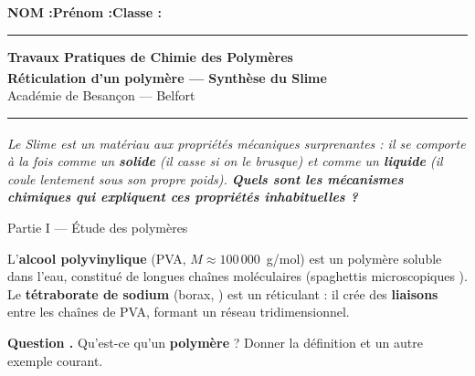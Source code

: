 \documentclass[11pt,a4paper]{article}
\newcommand{\sectitle}[1]{%
  \vspace{6pt}
  \noindent\colorbox{exoheader}{\parbox{\dimexpr\linewidth-2\fboxsep}%
    {\color{white}\bfseries\large\strut\quad #1}}
  \vspace{4pt}
}
\newcounter{question}
\newcommand{\question}{%
  \stepcounter{question}%
  \noindent\textcolor{exoheader}{\textbf{Question \thequestion.}}\quad
}
\begin{document}
\noindent\textbf{NOM :}\hfill\textbf{Prénom :}\hfill\textbf{Classe :}\hfill\phantom{x}\\[0.2cm]
\hrule\vspace{0.2cm}

\begin{center}
  {\large\bfseries\textcolor{exoheader}{Travaux Pratiques de Chimie des Polymères}}\\[4pt]
  {\LARGE\bfseries Réticulation d'un polymère --- Synthèse du Slime\textsuperscript{\textregistered}}\\[2pt]
  {\small Académie de Besançon --- Belfort}
\end{center}
\hrule\vspace{6pt}

\begin{tcolorbox}[enhanced, colback=problemebg, colframe=exoheader, boxrule=1.5pt,
  title={\faFlask\quad Problématique},
  fonttitle=\bfseries\color{white},
  attach boxed title to top left={yshift=-2mm, xshift=4mm},
  boxed title style={colback=exoheader, colframe=exoheader}]
\textit{Le Slime\textsuperscript{\textregistered} est un matériau aux propriétés mécaniques surprenantes :
il se comporte à la fois comme un \textbf{solide} (il casse si on le brusque) et comme un \textbf{liquide}
(il coule lentement sous son propre poids).
\textbf{Quels sont les mécanismes chimiques qui expliquent ces propriétés inhabituelles ?}}
\end{tcolorbox}

\vspace{6pt}

\sectitle{Partie I --- Étude des polymères}

\begin{mdframed}[backgroundcolor=exolight, linecolor=exoheader, linewidth=1.2pt]
L'\textbf{alcool polyvinylique} (PVA, $M \approx 100\,000$~g/mol) est un polymère soluble dans l'eau,
constitué de longues chaînes moléculaires (\og spaghettis microscopiques \fg{}).
Le \textbf{tétraborate de sodium} (borax, ) est un réticulant : il crée des \textbf{liaisons}
entre les chaînes de PVA, formant un réseau tridimensionnel.
\end{mdframed}

\vspace{4pt}
\question Qu'est-ce qu'un \textbf{polymère} ? Donner la définition et un autre exemple courant. \dotfill
\end{document}
